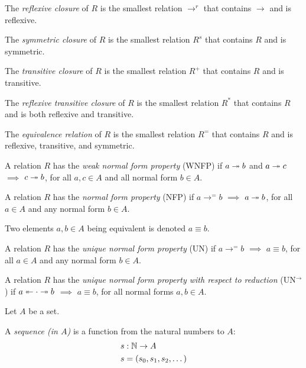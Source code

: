 \documentclass{scrartcl}
\begin{document}
\begin{dfn}
  The \emph{reflexive closure} of $R$ is the smallest relation $\to^r$ that contains $\to$ and is reflexive.
\end{dfn}
\begin{dfn}
  The \emph{symmetric closure} of $R$ is the smallest relation $R^s$ that contains $R$ and is symmetric.
\end{dfn}
\begin{dfn}
  The \emph{transitive closure} of $R$ is the smallest relation $R^+$ that contains $R$ and is transitive.
\end{dfn}
\begin{dfn}
  The \emph{reflexive transitive closure} of $R$ is the smallest relation $R^*$ that contains $R$ and is both reflexive and transitive.
\end{dfn}
\begin{dfn}
  The \emph{equivalence relation} of $R$ is the smallest relation $R^=$ that contains $R$ and is reflexive, transitive, and symmetric.
\end{dfn}

\begin{dfn}
  A relation $R$ has the \emph{weak normal form property} (WNFP) if
 $a \twoheadrightarrow b$ and $a \twoheadrightarrow c$  $\implies$
 $c \twoheadrightarrow b$, for all $a,c \in A$ and all normal form $b \in A$.
\end{dfn}


\begin{dfn}
  A relation $R$ has the \emph{normal form property} (NFP) if
 $a \to^= b$  $\implies$
 $a \twoheadrightarrow b$, for all $a \in A$ and any normal form $b \in A$.
\end{dfn}

Two elements $a, b \in A$ being equivalent is denoted $a \equiv b$.

\begin{dfn}
  A relation $R$ has the \emph{unique normal form property} (UN) if
  $a \to^= b$  $\implies$
  $a \equiv b$, for all $a \in A$ and any normal form $b \in A$.
\end{dfn}

\begin{dfn}
  A relation $R$ has the \emph{unique normal form property with respect to reduction} (UN$^ \to$) if
  $a \twoheadleftarrow  \cdot  \twoheadrightarrow b$  $\implies$ $a \equiv b$, for all normal forms $a,b \in A$.
\end{dfn}

Let $A$ be a set.
\begin{dfn}
  A \emph{sequence (in $A$)} is a function from the natural numbers to $A$:
  \begin{align*}
    &s : \mathbb{N} \to A \\
    &s = (s_0,s_1,s_2,\dots)
  \end{align*}
\end{dfn}
\end{document}
